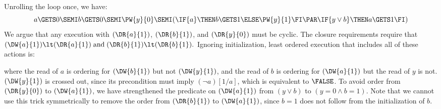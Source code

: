 Unrolling the loop once, we have:
\begin{displaymath}
   a\GETS 0\SEMI
   b\GETS 0\SEMI
   \PW{y}{0}\SEMI
  (\IF{a}\THEN b\GETS 1\ELSE \PW{y}{1}\FI 
  \PAR
  \IF{y\lor b}\THEN a\GETS 1\FI)
\end{displaymath}
We argue that any execution with $(\DR{a}{1})$, $(\DR{b}{1})$, and
$(\DR{y}{0})$ must be cyclic.  The closure requirements require that
\begin{math}
  (\DW{a}{1})\lt(\DR{a}{1})
  \;\text{and}\;
  (\DR{b}{1})\lt(\DR{b}{1}).
\end{math}
Ignoring initialization, least ordered execution that includes all of these
actions is:
\begin{tikzdisplay}[node distance=1em]
\end{tikzdisplay}
where the read of $a$ is ordering for $(\DW{b}{1})$ but
not $(\DW{y}{1})$, and the read of $b$ is ordering for $(\DW{a}{1})$ but the
read of $y$ is not.  $(\DW{y}{1})$ is crossed out, since its
precondition must imply $(\lnot a)[1/a]$, which is equivalent to $\FALSE$.
To avoid order from $(\DR{y}{0})$ to $(\DW{a}{1})$, we
have strengthened the predicate on $(\DW{a}{1})$ from $(y\lor b)$ to
$(y=0\land b=1)$.  Note that we cannot use this trick symmetrically to remove
the order from $(\DR{b}{1})$ to $(\DW{a}{1})$, since $b=1$ does not follow
from the initialization of $b$.




